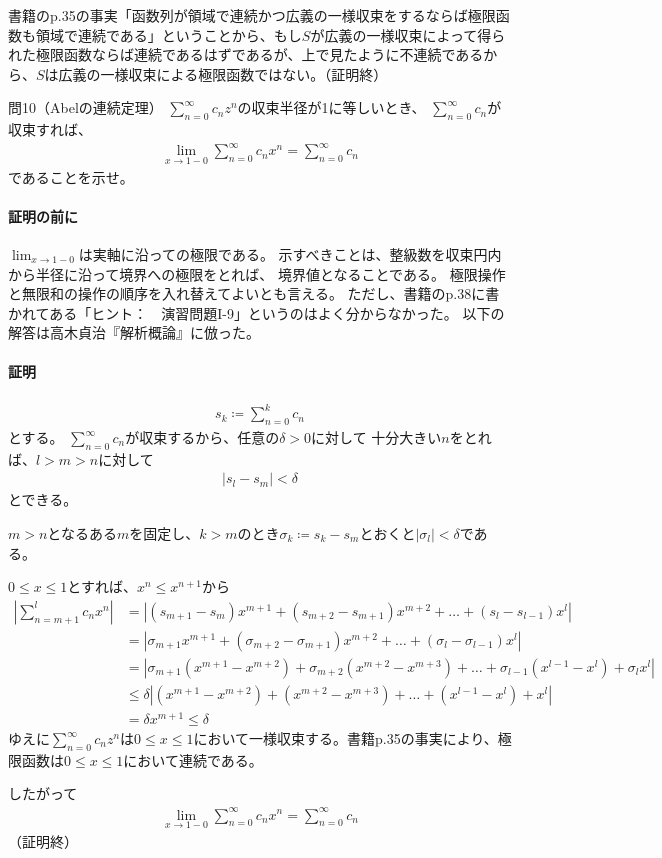 書籍のp.35の事実「函数列が領域で連続かつ広義の一様収束をするならば極限函数も領域で連続である」ということから、もし$S$が広義の一様収束によって得られた極限函数ならば連続であるはずであるが、上で見たように不連続であるから、$S$は広義の一様収束による極限函数ではない。（証明終）

\begin{mysimplebox}{問10（Abelの連続定理）}
    $\sum_{n=0}^{\infty}c_nz^n$の収束半径が1に等しいとき、
    $\sum_{n=0}^{\infty}c_n$が収束すれば、
    \begin{align*}
        \lim_{x\to 1-0}\sum_{n=0}^{\infty}c_nx^n=\sum_{n=0}^{\infty}c_n
    \end{align*}
    であることを示せ。
\end{mysimplebox}
\paragraph{証明の前に}
$\lim_{x\to 1-0}$は実軸に沿っての極限である。
示すべきことは、整級数を収束円内から半径に沿って境界への極限をとれば、
境界値となることである。
極限操作と無限和の操作の順序を入れ替えてよいとも言える。
ただし、書籍のp.38に書かれてある「ヒント：　演習問題I-9」というのはよく分からなかった。
以下の解答は高木貞治『解析概論』に倣った。

\paragraph{証明}
\begin{align*}
    s_k\coloneqq\sum_{n=0}^{k}c_n
\end{align*}
とする。
$\sum_{n=0}^{\infty}c_n$が収束するから、任意の$\delta>0$に対して
十分大きい$n$をとれば、$l>m>n$に対して
\begin{align*}
    |s_l-s_m|<\delta
\end{align*}
とできる。

$m>n$となるある$m$を固定し、$k>m$のとき$\sigma_k\coloneqq s_k-s_m$とおくと$|\sigma_l|<\delta$である。

$0\le x\le 1$とすれば、$x^n\le x^{n+1}$から
\begin{align*}
    \left|\sum_{n=m+1}^{l}c_nx^n\right|
    &=\left|(s_{m+1}-s_m)x^{m+1}+(s_{m+2}-s_{m+1})x^{m+2}+\dots+(s_l-s_{l-1})x^l\right|\\
    &=\left|\sigma_{m+1}x^{m+1}+(\sigma_{m+2}-\sigma_{m+1})x^{m+2}+\dots+(\sigma_l-\sigma_{l-1})x^l\right|\\
    &=\left|\sigma_{m+1}(x^{m+1}-x^{m+2})+\sigma_{m+2}(x^{m+2}-x^{m+3})+\dots+\sigma_{l-1}(x^{l-1}-x^l)+\sigma_lx^l\right|\\
    &\le\delta\left|(x^{m+1}-x^{m+2})+(x^{m+2}-x^{m+3})+\dots+(x^{l-1}-x^l)+x^l\right|\\
    &=\delta x^{m+1}\le\delta
\end{align*}
ゆえに$\sum_{n=0}^{\infty}c_nz^n$は$0\le x\le 1$において一様収束する。書籍p.35の事実により、極限函数は$0\le x\le 1$において連続である。

したがって
\begin{align*}
    \lim_{x\to 1-0}\sum_{n=0}^{\infty}c_nx^n=\sum_{n=0}^{\infty}c_n
\end{align*}
（証明終）